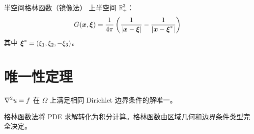 \begin{mydefinition}{半空间格林函数（镜像法）}
上半空间 $\mathbb{R}^3_+$：
\[
G(\boldsymbol{x},\boldsymbol{\xi})=\frac{1}{4\pi}\left(\frac{1}{|\boldsymbol{x}-\boldsymbol{\xi}|}-\frac{1}{|\boldsymbol{x}-\boldsymbol{\xi}^*|}\right)
\]
其中 $\boldsymbol{\xi}^*=(\xi_1,\xi_2,-\xi_3)$。
\end{mydefinition}

\section{唯一性定理}

\begin{theorem}
$\nabla^2 u=f$ 在 $\Omega$ 上满足相同 Dirichlet 边界条件的解唯一。
\end{theorem}

\begin{remark}
格林函数法将 PDE 求解转化为积分计算。格林函数由区域几何和边界条件类型完全决定。
\end{remark}
